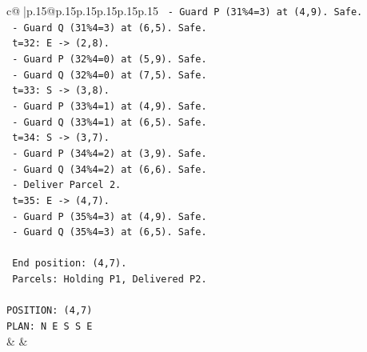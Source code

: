 \documentclass{article}
\begin{document}
{\begin{supertabular}{c@{$\;$}|p{.15\linewidth}@{}p{.15\linewidth}p{.15\linewidth}p{.15\linewidth}p{.15\linewidth}p{.15\linewidth}}
{{{\texttt{     {-} Guard P (31\%4=3) at (4,9). Safe.} \\
\texttt{     {-} Guard Q (31\%4=3) at (6,5). Safe.} \\
\texttt{   t=32: E {-}> (2,8).} \\
\texttt{     {-} Guard P (32\%4=0) at (5,9). Safe.} \\
\texttt{     {-} Guard Q (32\%4=0) at (7,5). Safe.} \\
\texttt{   t=33: S {-}> (3,8).} \\
\texttt{     {-} Guard P (33\%4=1) at (4,9). Safe.} \\
\texttt{     {-} Guard Q (33\%4=1) at (6,5). Safe.} \\
\texttt{   t=34: S {-}> (3,7).} \\
\texttt{     {-} Guard P (34\%4=2) at (3,9). Safe.} \\
\texttt{     {-} Guard Q (34\%4=2) at (6,6). Safe.} \\
\texttt{     {-} Deliver Parcel 2.} \\
\texttt{   t=35: E {-}> (4,7).} \\
\texttt{     {-} Guard P (35\%4=3) at (4,9). Safe.} \\
\texttt{     {-} Guard Q (35\%4=3) at (6,5). Safe.} \\
\\ 
\texttt{   End position: (4,7).} \\
\texttt{   Parcels: Holding P1, Delivered P2.} \\
\\ 
\texttt{POSITION: (4,7)} \\
\texttt{PLAN: N E S S E} \\
            }
        }
    }
    & & \\ \\


\end{supertabular}}
\end{document}

